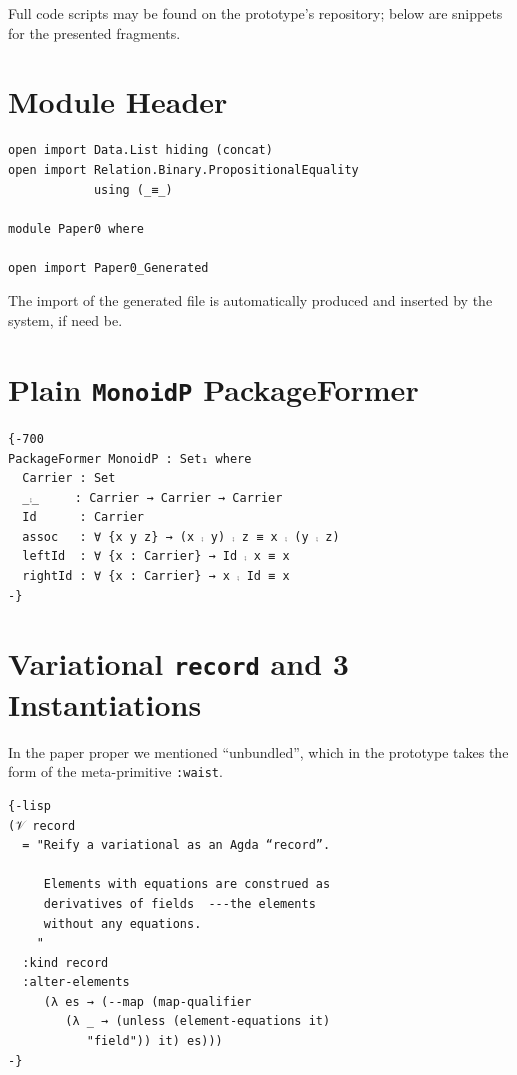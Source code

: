\documentclass[sigplan,screen]{acmart}
\begin{document}
\newpage
\begin{appendices}

Full code scripts may be found on the prototype's repository; below are
snippets for the presented fragments.

\section{Module Header}
\label{sec:orgf64e26e}

\begin{verbatim}
open import Data.List hiding (concat)
open import Relation.Binary.PropositionalEquality
            using (_≡_)

module Paper0 where

open import Paper0_Generated
\end{verbatim}

\vspace{0.3em}
\noindent
The import of the generated file is automatically produced and
inserted by the system, if need be.

\section{Plain \texttt{MonoidP} PackageFormer}
\label{sec:org2a8d5d6}
\begin{verbatim}
{-700
PackageFormer MonoidP : Set₁ where
  Carrier : Set
  _⨾_     : Carrier → Carrier → Carrier
  Id      : Carrier
  assoc   : ∀ {x y z} → (x ⨾ y) ⨾ z ≡ x ⨾ (y ⨾ z)
  leftId  : ∀ {x : Carrier} → Id ⨾ x ≡ x
  rightId : ∀ {x : Carrier} → x ⨾ Id ≡ x
-}
\end{verbatim}

\section{Variational \texttt{record} and 3 Instantiations}
\label{sec:org98b0d16}
   In the paper proper we mentioned “unbundled”, which in the prototype
takes the form of the meta-primitive \texttt{:waist}.
\begin{verbatim}
{-lisp
(𝒱 record
  = "Reify a variational as an Agda “record”.

     Elements with equations are construed as
     derivatives of fields  ---the elements
     without any equations.
    "
  :kind record
  :alter-elements
     (λ es → (--map (map-qualifier
        (λ _ → (unless (element-equations it)
           "field")) it) es)))
-}
\end{verbatim}


\end{appendices}
\end{document}
